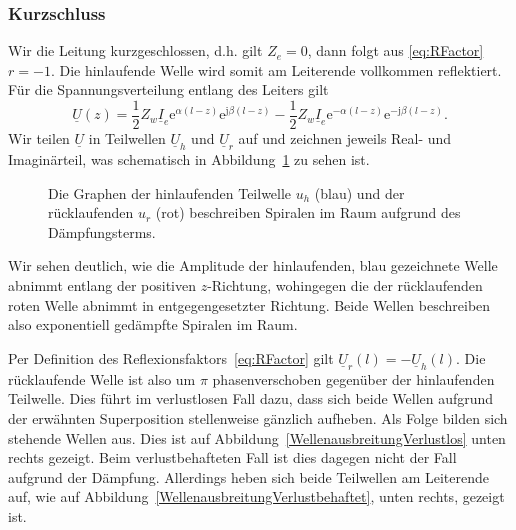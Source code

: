 \documentclass[paper=a4, parskip=half-, ngerman, fontsize=11pt]{scrreprt}
\begin{document}
\subsubsection{Kurzschluss}
Wir die Leitung kurzgeschlossen, d.h. gilt $Z_{e} = 0$, dann folgt aus \eqref{eq:RFactor} $r=-1$. Die hinlaufende Welle
wird somit am Leiterende vollkommen reflektiert. Für die Spannungsverteilung entlang des Leiters gilt
\begin{equation}
\underline{U}(z) =
\frac{1}{2} Z_{w} \underline{I}_{e}
\mathrm{e}^{\alpha (l - z)}
\mathrm{e}^{\mathrm{j} \beta (l - z)}
-
\frac{1}{2} Z_{w} \underline{I}_{e}
\mathrm{e}^{- \alpha (l - z)}
\mathrm{e}^{- \mathrm{j} \beta (l - z)} \label{eq:UKurzschluss}.
\end{equation}
Wir teilen $\underline{U}$ in Teilwellen $\underline{U}_{h}$ und $\underline{U}_{r}$ auf und zeichnen jeweils Real-
und Imaginärteil, was schematisch in Abbildung~\ref{ImaginaerWelle} zu sehen ist.
\begin{figure}[ht]
    \begin{center}
        
        \caption{Die Graphen der hinlaufenden Teilwelle $u_{h}$ (blau) und der rücklaufenden $u_{r}$ (rot) beschreiben
        Spiralen im Raum aufgrund des Dämpfungsterms.}
        \label{ImaginaerWelle}
    \end{center}
\end{figure}
Wir sehen deutlich, wie die Amplitude der hinlaufenden, blau gezeichnete Welle abnimmt entlang der positiven
$z$-Richtung, wohingegen die der rücklaufenden roten Welle abnimmt in entgegengesetzter Richtung. Beide Wellen
beschreiben also exponentiell gedämpfte Spiralen im Raum.

Per Definition des Reflexionsfaktors~\eqref{eq:RFactor} gilt $\underline{U}_{r}(l) = - \underline{U}_{h}(l)$. Die
rücklaufende Welle ist also um $\pi$ phasenverschoben gegenüber der hinlaufenden Teilwelle. Dies führt im verlustlosen
Fall dazu, dass sich beide Wellen aufgrund der erwähnten Superposition stellenweise gänzlich aufheben. Als Folge bilden
sich stehende Wellen aus. Dies ist auf Abbildung~\ref{WellenausbreitungVerlustlos} unten rechts gezeigt. Beim
verlustbehafteten Fall ist dies dagegen nicht der Fall aufgrund der Dämpfung. Allerdings heben sich beide Teilwellen am
Leiterende auf, wie auf Abbildung~\ref{WellenausbreitungVerlustbehaftet}, unten rechts, gezeigt ist.
\end{document}
